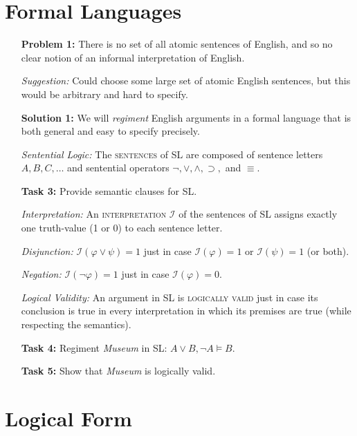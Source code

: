 \documentclass[a4paper, 11pt]{article} %
\newcommand{\I}{\mathcal{I}}
\begin{document}
\section*{Formal Languages}

\begin{enumerate}[leftmargin=1.2in,labelsep=.15in] %
  \item[\bf Problem 1:] There is no set of all atomic sentences of English, and so no clear notion of an informal interpretation of English.
  \item[\it Suggestion:] Could choose some large set of atomic English sentences, but this would be arbitrary and hard to specify.
  \item[\bf Solution 1:] We will \textit{regiment} English arguments in a formal language that is both general and easy to specify precisely.
  \item[\it Sentential Logic:] The \textsc{sentences} of SL are composed of sentence letters $A, B, C, \ldots$ and sentential operators $\neg,\vee,\wedge,\supset,$ and $\equiv$.
  \item[\bf Task 3:] Provide semantic clauses for SL.
  \item[\it Interpretation:] An \textsc{interpretation} $\I$ of the sentences of SL assigns exactly one truth-value (1 or 0) to each sentence letter.
  \item[\it Disjunction:] $\I(\varphi\vee\psi)=1$ just in case $\I(\varphi)=1$ or $\I(\psi)=1$ (or both). 
  \item[\it Negation:] $\I(\neg\varphi)=1$ just in case $\I(\varphi)=0$. 
  \item[\it Logical Validity:] An argument in SL is \textsc{logically valid} just in case its conclusion is true in every interpretation in which its premises are true (while respecting the semantics).
  \item[\bf Task 4:] Regiment \textit{Museum} in SL: $A\vee B, \neg A \vDash B$.
  \item[\bf Task 5:] Show that \textit{Museum} is logically valid.
\end{enumerate}




\section*{Logical Form}
\end{document}
